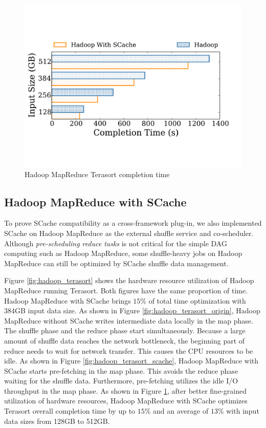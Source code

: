 \begin{figure}
	\includegraphics[width=\linewidth]{fig/hadoop_terasort_time}
	\caption{\color{black}Hadoop MapReduce Terasort completion time}
	\label{fig:hadoop_terasort_time}
\end{figure}


{\color{black}
\subsection{Hadoop MapReduce with SCache}

To prove SCache compatibility as a cross-framework plug-in, we also implemented SCache on Hadoop MapReduce as the external shuffle service and co-scheduler. Although \textit{pre-scheduling reduce tasks} is not critical for the simple DAG computing such as Hadoop MapReduce, some shuffle-heavy jobs on Hadoop MapReduce can still be optimized by SCache shuffle data management.

Figure \ref{fig:hadoop_terasort} shows the hardware resource utilization of Hadoop MapReduce running Terasort. Both figures have the same proportion of time. Hadoop MapReduce with SCache brings $15\%$ of total time optimization with 384GB input data size. 
As shown in Figure \ref{fig:hadoop_terasort_origin}, Hadoop MapReduce without SCache writes intermediate data locally in the map phase. The shuffle phase and the reduce phase start simultaneously. Because a large amount of shuffle data reaches the network bottleneck, the beginning part of reduce needs to wait for network transfer. This causes the CPU resources to be idle. 
As shown in Figure \ref{fig:hadoop_terasort_scache}, Hadoop MapReduce with SCache starts pre-fetching in the map phase. This avoids the reduce phase waiting for the shuffle data. Furthermore, pre-fetching utilizes the idle I/O throughput in the map phase. As shown in Figure \ref{fig:hadoop_terasort_time}, after better fine-grained utilization of hardware resources, Hadoop MapReduce with SCache optimizes Terasort overall completion time by up to $15\%$ and an average of $13\%$ with input data sizes from 128GB to 512GB.
}

